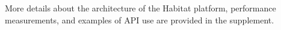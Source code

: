 

More details about the architecture of the Habitat platform, performance measurements, and examples of API use are provided in the supplement.
